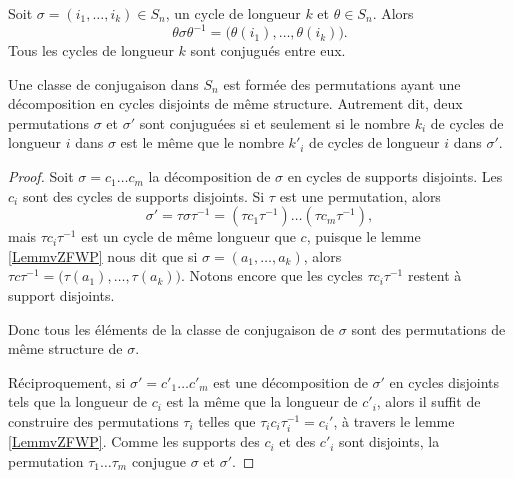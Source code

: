 \begin{lemma}        \label{LemmvZFWP}
    Soit \( \sigma=(i_1,\ldots, i_k)\in S_n\), un cycle de longueur \( k\) et \( \theta\in S_n\). Alors
    \begin{equation}
        \theta\sigma\theta^{-1}=\big( \theta(i_1),\ldots, \theta(i_k) \big).
    \end{equation}
    Tous les cycles de longueur \( k\) sont conjugués entre eux.
\end{lemma}

\begin{proposition} \label{PropEAHWXwe}
    Une classe de conjugaison dans \( S_n\) est formée des permutations ayant une décomposition en cycles disjoints de même structure. Autrement dit, deux permutations \( \sigma\) et \( \sigma'\) sont conjuguées si et seulement si le nombre \( k_i\) de cycles de longueur \( i\) dans \( \sigma\) est le même que le nombre \( k'_i\) de cycles de longueur \( i\) dans \( \sigma'\).
\end{proposition}

\begin{proof}
    Soit \( \sigma=c_1\ldots c_m\) la décomposition de \( \sigma\) en cycles de supports disjoints. Les \( c_i\) sont des cycles de supports disjoints. Si \( \tau\) est une permutation, alors
    \begin{equation}
        \sigma'=\tau\sigma\tau^{-1}=(\tau c_1\tau^{-1})\ldots (\tau c_m\tau^{-1}),
    \end{equation}
    mais \( \tau c_i\tau^{-1}\) est un cycle de même longueur que \( c\), puisque le lemme \ref{LemmvZFWP} nous dit que si \( \sigma=(a_1,\ldots, a_k)\), alors \( \tau c\tau^{-1}=\big( \tau(a_1),\ldots, \tau(a_k) \big)\). Notons encore que les cycles \( \tau c_i\tau^{-1}\) restent à support disjoints.

    Donc tous les éléments de la classe de conjugaison de \( \sigma\) sont des permutations de même structure de \( \sigma\).

    Réciproquement, si \( \sigma'=c'_1\ldots c'_m\) est une décomposition de \( \sigma'\) en cycles disjoints tels que la longueur de \( c_i\) est la même que la longueur de \( c'_i\), alors il suffit de construire des permutations \( \tau_i\) telles que \( \tau_i c_i\tau_i^{-1}=c_i'\), à travers le lemme \ref{LemmvZFWP}. Comme les supports des $c_i$ et des $c'_i$ sont disjoints, la permutation \( \tau_1\ldots \tau_m\) conjugue \( \sigma\) et \( \sigma'\).
\end{proof}

